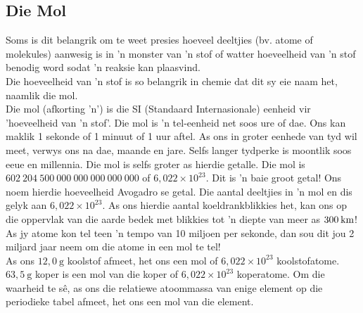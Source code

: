             \subsection*{Die Mol}
            \nopagebreak
Soms is dit belangrik om te weet presies hoeveel deeltjies (bv. atome of molekules) aanwesig is in 'n monster van 'n stof of watter hoeveelheid van 'n stof benodig word sodat  'n reaksie kan plaasvind.\\
Die hoeveelheid van  'n stof is so belangrik in chemie dat dit sy eie naam het, naamlik die mol.\\
 {Die mol (afkorting 'n') is die SI (Standaard Internasionale) eenheid vir 'hoeveelheid van 'n stof'. } 
Die mol is 'n tel-eenheid net soos ure of dae. Ons kan maklik 1 sekonde of 1 minuut of 1 uur aftel. As ons in groter eenhede van tyd wil meet, verwys ons na dae, maande en jare. Selfs langer tydperke is moontlik soos eeue en millennia. Die mol is selfs groter as hierdie getalle. Die mol is $602 ~204 ~500 ~000 ~000 ~000 ~000 ~000$ of $6,022 \times 10^{23}$. Dit is 'n baie groot getal! Ons noem hierdie hoeveelheid Avogadro se getal. 
 {Die aantal deeltjies in 'n mol en dis gelyk aan $6,022\ensuremath{\times}{10}^{23}$.} 
As ons hierdie aantal koeldrankblikkies het, kan ons op die oppervlak van die aarde bedek met blikkies tot 'n diepte van meer as $300\phantom{\rule{2pt}{0ex}}\text{km}$! As jy atome kon tel teen 'n tempo van 10 miljoen per sekonde, dan sou dit jou 2 miljard jaar neem om die atome in een mol te tel! \\

As ons $12,0 ~\text{g}$ koolstof afmeet, het ons een mol of $6,022 \times 10^{23}$ koolstofatome. $63,5 ~\text{g}$ koper is een mol van die koper of $6,022 \times 10^{23}$ koperatome. Om die waarheid te s\^{e}, as ons die relatiewe atoommassa van enige element op die periodieke tabel afmeet, het ons een mol van die element.

